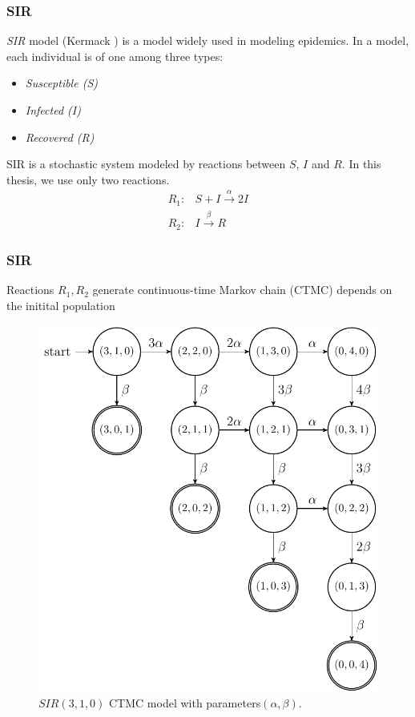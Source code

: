 \documentclass{beamer}
\begin{document}
\begin{frame}
    \frametitle{SIR}
    \textit{SIR} model (Kermack \cite{kermack1927contribution}) is a model widely used in modeling
    epidemics. In a  model, each individual is of one among three types:
    \begin{itemize}
        \item \textit{Susceptible (S)}
        \item \textit{Infected (I)}
        \item \textit{Recovered (R)}
    \end{itemize}
    SIR is a stochastic system modeled by reactions between $S$, $I$ and $R$. In this thesis, we use
    only two reactions.
    \begin{align*}
        R_1: & S + I \xrightarrow{\alpha} 2I \\
        R_2: & I     \xrightarrow{\beta} R
    \end{align*}
\end{frame}

\begin{frame}
    \frametitle{SIR}
    Reactions $R_1, R_2$ generate continuous-time Markov chain (CTMC) depends on the initital population
    \begin{figure}[H]
        \centering
        \includegraphics[width=0.5\linewidth]{figures/sir310_ctmc.png}
        \caption{$SIR(3,1,0)$ CTMC model with parameters$(\alpha, \beta)$.}
    \end{figure}
\end{frame}
\end{document}
